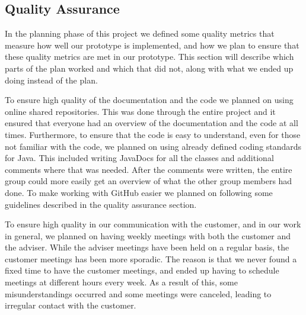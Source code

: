 \documentclass[../document]{subfiles}
\begin{document}
\subsection{Quality Assurance}
In the planning phase of this project we defined some quality metrics that measure how well our prototype is implemented, and how we plan to ensure that these quality metrics are met in our prototype. This section will describe which parts of the plan worked and which that did not, along with what we ended up doing instead of the plan.

To ensure high quality of the documentation and the code we planned on using online shared repositories. This was done through the entire project and it ensured that everyone had an overview of the documentation and the code at all times. Furthermore, to ensure that the code is easy to understand, even for those not familiar with the code, we planned on using already defined coding standards for \gls{Java}. This included writing JavaDocs for all the classes and additional comments where that was needed. After the comments were written, the entire group could more easily get an overview of what the other group members had done. To make working with GitHub easier we planned on following some guidelines described in the quality assurance section.

To ensure high quality in our communication with the customer, and in our work in general, we planned on having weekly meetings with both the customer and the adviser. While the adviser meetings have been held on a regular basis, the customer meetings has been more sporadic. The reason is that we never found a fixed time to have the customer meetings, and ended up having to schedule meetings at different hours every week. As a result of this, some misunderstandings occurred and some meetings were canceled, leading to irregular contact with the customer.
\end{document}
